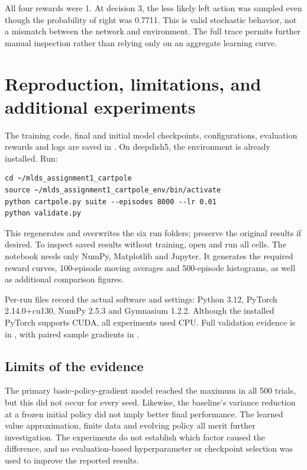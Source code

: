 \documentclass[11pt,letterpaper]{article}
\begin{document}
All four rewards were 1. At decision 3, the less likely left action was sampled even though the probability of right was 0.7711. This is valid stochastic behavior, not a mismatch between the network and environment. The full trace permits further manual inspection rather than relying only on an aggregate learning curve.

\clearpage
\section{Reproduction, limitations, and additional experiments}
The training code, final and initial model checkpoints, configurations, evaluation rewards and logs are saved in . On deepdish5, the environment is already installed. Run:
\begin{verbatim}
cd ~/mlds_assignment1_cartpole
source ~/mlds_assignment1_cartpole_env/bin/activate
python cartpole.py suite --episodes 8000 --lr 0.01
python validate.py
\end{verbatim}
This regenerates and overwrites the six run folders; preserve the original results if desired. To inspect saved results without training, open  and run all cells. The notebook needs only NumPy, Matplotlib and Jupyter. It generates the required reward curves, 100-episode moving averages and 500-episode histograms, as well as additional comparison figures.

Per-run  files record the actual software and settings: Python 3.12, PyTorch 2.14.0+cu130, NumPy 2.5.3 and Gymnasium 1.2.2. Although the installed PyTorch supports CUDA, all experiments used CPU. Full validation evidence is in , with paired sample gradients in .

\subsection{Limits of the evidence}
The primary basic-policy-gradient model reached the maximum in all 500 trials, but this did not occur for every seed. Likewise, the baseline's variance reduction at a frozen initial policy did not imply better final performance. The learned value approximation, finite data and evolving policy all merit further investigation. The experiments do not establish which factor caused the difference, and no evaluation-based hyperparameter or checkpoint selection was used to improve the reported results.
\end{document}
